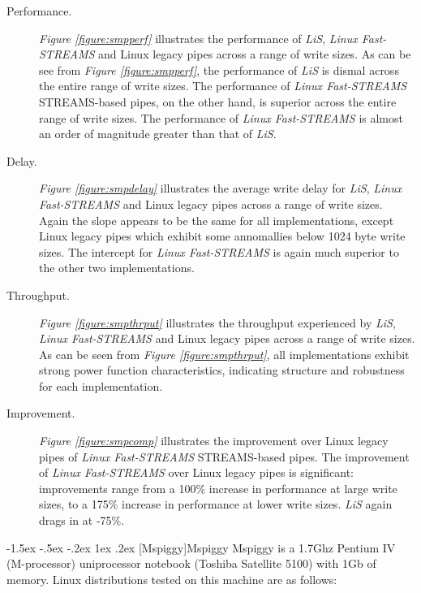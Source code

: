 \documentclass[letterpaper,final,notitlepage,twocolumn,10pt,twoside]{article}
\makeatletter
\renewcommand\subsection{\@startsection{subsection}{2}{\z@}%
                                     {-1.5ex \@plus -.5ex \@minus -.2ex}%
                                     {1ex \@plus .2ex}%
                                     {\normalfont\normalsize\bfseries}}
\makeatother
\begin{document}
\begin{description}

\item[Performance.]

\textit{Figure \ref{figure:smpperf}} illustrates the performance of
\textsl{LiS}, \textsl{Linux Fast-STREAMS} and Linux legacy pipes across a
range of write sizes.  As can be see from \textit{Figure
\ref{figure:smpperf}}, the performance of \textsl{LiS} is dismal across the
entire range of write sizes.  The performance of \textsl{Linux Fast-STREAMS}
STREAMS-based pipes, on the other hand, is superior across the entire range of
write sizes.  The performance of \textsl{Linux Fast-STREAMS} is almost an
order of magnitude greater than that of \textsl{LiS}.

\item[Delay.]

\textit{Figure \ref{figure:smpdelay}} illustrates the average write delay for
\textsl{LiS}, \textsl{Linux Fast-STREAMS} and Linux legacy pipes across a
range of write sizes.  Again the slope appears to be the same for all
implementations, except Linux legacy pipes which exhibit some annomallies
below 1024 byte write sizes.  The intercept for \textsl{Linux Fast-STREAMS} is
again much superior to the other two implementations.

\item[Throughput.]

\textit{Figure \ref{figure:smpthrput}} illustrates the throughput experienced
by \textsl{LiS}, \textsl{Linux Fast-STREAMS} and Linux legacy pipes across a
range of write sizes.  As can be seen from \textit{Figure
\ref{figure:smpthrput}}, all implementations exhibit strong power function
characteristics, indicating structure and robustness for each implementation.

\item[Improvement.]

\textit{Figure \ref{figure:smpcomp}} illustrates the improvement over Linux
legacy pipes of \textsl{Linux Fast-STREAMS} STREAMS-based pipes.  The
improvement of \textsl{Linux Fast-STREAMS} over Linux legacy pipes is
significant: improvements range from a 100\% increase in performance at large
write sizes, to a 175\% increase in performance at lower write sizes.
\textsl{LiS} again drags in at -75\%.

\end{description}

\subsection[Mspiggy]{Mspiggy}
Mspiggy is a 1.7Ghz Pentium IV (M-processor) uniprocessor notebook (Toshiba
Satellite 5100) with 1Gb of memory.  Linux distributions tested on this
machine are as follows:
\end{document}
